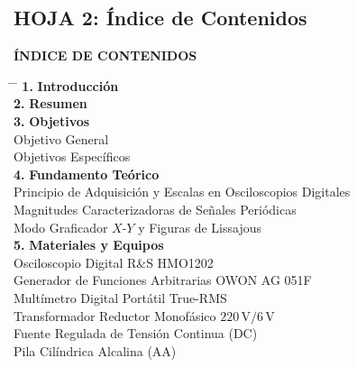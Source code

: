 \documentclass[a4paper, 11pt]{article}
\begin{document}
\subsection*{\color{uni-blue} HOJA 2: Índice de Contenidos}
\begin{tcolorbox}[title=Texto a Escribir en el Índice (Trazar líneas punteadas con regla), colframe=black]
    \small
    \begin{center}
        {\large\bfseries ÍNDICE DE CONTENIDOS}\\[0.3cm]
    \end{center}
    \begin{tabbing}
        \hspace{0.5cm} \= \hspace{12.0cm} \= \kill
        \textbf{1.} \> \textbf{Introducción} \dotfill \> [ \quad ] \\
        \textbf{2.} \> \textbf{Resumen} \dotfill \> [ \quad ] \\
        \textbf{3.} \> \textbf{Objetivos} \dotfill \> [ \quad ] \\
         Objetivo General \dotfill \> [ \quad ] \\
         Objetivos Específicos \dotfill \> [ \quad ] \\
        \textbf{4.} \> \textbf{Fundamento Teórico} \dotfill \> [ \quad ] \\
         Principio de Adquisición y Escalas en Osciloscopios Digitales \dotfill \> [ \quad ] \\
         Magnitudes Caracterizadoras de Señales Periódicas \dotfill \> [ \quad ] \\
         Modo Graficador $X$-$Y$ y Figuras de Lissajous \dotfill \> [ \quad ] \\
        \textbf{5.} \> \textbf{Materiales y Equipos} \dotfill \> [ \quad ] \\
         Osciloscopio Digital R\&S HMO1202 \dotfill \> [ \quad ] \\
         Generador de Funciones Arbitrarias OWON AG 051F \dotfill \> [ \quad ] \\
         Multímetro Digital Portátil True-RMS \dotfill \> [ \quad ] \\
         Transformador Reductor Monofásico $220\,\text{V}/6\,\text{V}$ \dotfill \> [ \quad ] \\
         Fuente Regulada de Tensión Continua (DC) \dotfill \> [ \quad ] \\
         Pila Cilíndrica Alcalina (AA) \dotfill \> [ \quad ] \\

\end{tabbing}
\end{tcolorbox}
\end{document}
